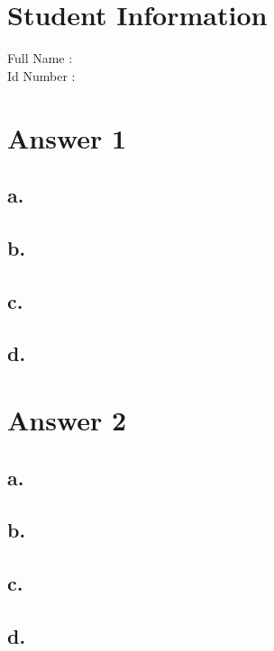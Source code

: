 \documentclass[12pt]{article}
\begin{document}
\section*{Student Information} 
Full Name :  \\
Id Number :  \\

\section*{Answer 1}

\subsection*{a.}

\subsection*{b.}

\subsection*{c.}

\subsection*{d.}


\section*{Answer 2}

\subsection*{a.}

\subsection*{b.}

\subsection*{c.}

\subsection*{d.}
\end{document}
